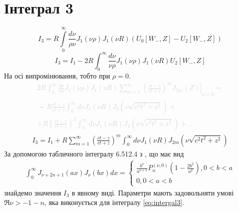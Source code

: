 \section{Інтеграл 3}

\begin{equation} 
I_3 = R \int \limits_{0}^{\infty} \frac{d \nu}{\rho \nu} 
J_1(\nu \rho) J_1(\nu R) (U_0[ W_-, Z ] - U_2[ W_-, Z ])
\end{equation}
%
\begin{equation} \label{eq:intergal3}
I_3 = I_1 - 2 R \int_{0}^{\infty} \frac{d \nu}{\nu \rho} 
J_1(\nu \rho) J_1(\nu R) U_2[ W_-, Z ]
\end{equation}
%
На осі випромінювання, тобто при $ \rho = 0 $. 
%
\textcolor{lightgray}{ \begin{equation*} \begin{aligned}
\left. 2 R \int_{0}^{\infty} \frac{d \nu}{\nu \rho} 
J_1(\nu \rho) J_1(\nu R) \sum_{m=1}^{\infty} \left( 
\frac{ct - z}{ct + z} \right)^m J_{2m} (Z) 
\right|_{\rho = 0} = \\ = R \frac{ct - z}{ct + z} \int_{0}^{\infty} 
d \nu J_1(\nu R) J_2 (\nu \sqrt{c^2t^2 + z^2}) + \\ 
+ R \left( \frac{ct - z}{ct + z} \right)^2 
\int_{0}^{\infty} d \nu J_1(\nu R) J_4 (\nu \sqrt{c^2t^2 + z^2}) + ...
\end{aligned} \end{equation*} }
%
\begin{equation*} \begin{aligned}
I_3 = I_1 + R \sum_{m=1}^{\infty} \left( \frac{ct - z}{ct + z} \right)^m 
\int_{0}^{\infty} d \nu J_1(\nu R) J_{2m} (\nu \sqrt{c^2t^2 + z^2})
\end{aligned} \end{equation*}
%
За допомогою табличного інтегралу 6.512.4 з 
\cite[ст. 681]{imp:GradshtejnInt}, що має вид
%
\begin{equation*} \begin{aligned}
\int_0^\infty J_{\nu+2n+1} (ax) J_\nu (bx) dx = 
\begin{cases} \frac{b^\nu}{a^{\nu+1}}
P_n^{(\nu,0)} \left( 1 - \frac{2b^2}{a^2} \right) , 0 < b < a \\
0, 0 < a < b \end{cases}
\end{aligned} \end{equation*}
%
знайдемо значення $ I_3 $ в явному виді. Параметри мають задовольняти умові  
$ \Re \nu > - 1 - n $, яка виконується для інтегралу \eqref{eq:intergal3}. 
